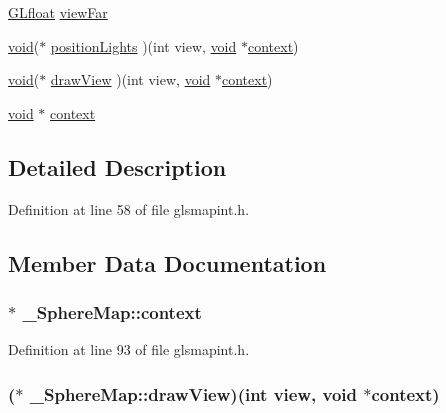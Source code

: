 \begin{DoxyCompactItemize}
\hyperlink{gl_8h_a31aeedaeef29442c9c015ab355c8f5ab}{G\-Lfloat} \hyperlink{struct___sphere_map_ac3aa620d297a12e05e6005800512a102}{view\-Far}
\item 
\hyperlink{glutf90_8h_ac778d6f63f1aaf8ebda0ce6ac821b56e}{void}($\ast$ \hyperlink{struct___sphere_map_ae696630b2f422031807c44e63b0f55a9}{position\-Lights} )(int view, \hyperlink{glutf90_8h_ac778d6f63f1aaf8ebda0ce6ac821b56e}{void} $\ast$\hyperlink{struct___sphere_map_ae9e17d367aea76564089d8b22c7b30c1}{context})
\item 
\hyperlink{glutf90_8h_ac778d6f63f1aaf8ebda0ce6ac821b56e}{void}($\ast$ \hyperlink{struct___sphere_map_af95cd5ff0a4c9c8c6c3e0445947c0163}{draw\-View} )(int view, \hyperlink{glutf90_8h_ac778d6f63f1aaf8ebda0ce6ac821b56e}{void} $\ast$\hyperlink{struct___sphere_map_ae9e17d367aea76564089d8b22c7b30c1}{context})
\item 
\hyperlink{glutf90_8h_ac778d6f63f1aaf8ebda0ce6ac821b56e}{void} $\ast$ \hyperlink{struct___sphere_map_ae9e17d367aea76564089d8b22c7b30c1}{context}
\end{DoxyCompactItemize}


\subsection{Detailed Description}


Definition at line 58 of file glsmapint.\-h.



\subsection{Member Data Documentation}
\hypertarget{struct___sphere_map_ae9e17d367aea76564089d8b22c7b30c1}{
\subsubsection[{context}]{$\ast$ \-\_\-\-Sphere\-Map\-::context}}\label{struct___sphere_map_ae9e17d367aea76564089d8b22c7b30c1}


Definition at line 93 of file glsmapint.\-h.

\hypertarget{struct___sphere_map_af95cd5ff0a4c9c8c6c3e0445947c0163}{
\subsubsection[{draw\-View}]{($\ast$ \-\_\-\-Sphere\-Map\-::draw\-View)(int view, {\bf void} $\ast${\bf context})}}\label{struct___sphere_map_af95cd5ff0a4c9c8c6c3e0445947c0163}



